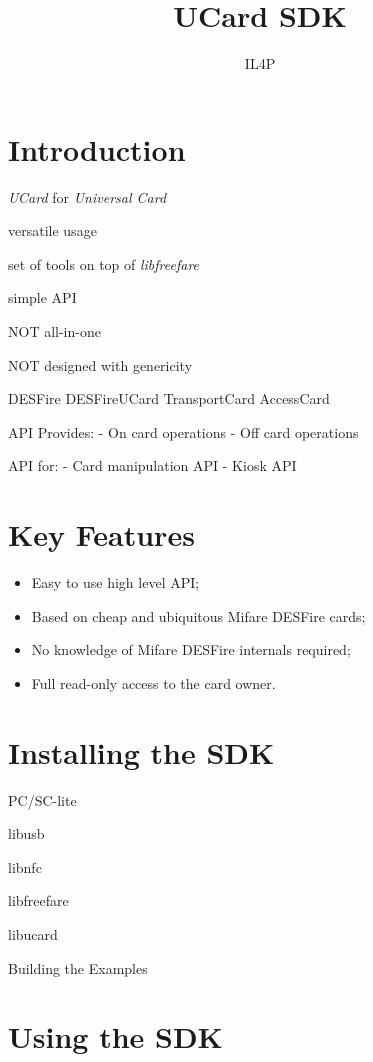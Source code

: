 \documentclass{article}
\title{UCard SDK}
\author{IL4P}
\begin{document}
\maketitle

\tableofcontents

\section{Introduction}

\emph{UCard} for \emph{Universal Card}

versatile usage

set of tools on top of \emph{libfreefare} \cite{libfreefare}

simple API

NOT all-in-one

NOT designed with genericity

DESFire
DESFireUCard
TransportCard
AccessCard

API Provides:
  - On card operations
	- Off card operations

API for:
  - Card manipulation API
	- Kiosk API

\section{Key Features}

\begin{itemize}
  \item Easy to use high level API;
	\item Based on cheap and ubiquitous Mifare DESFire cards;
	\item No knowledge of Mifare DESFire internals required;
  \item Full read-only access to the card owner.
\end{itemize}

\section{Installing the SDK}

PC/SC-lite

libusb

libnfc \cite{libnfc}

libfreefare \cite{libfreefare}

libucard

Building the Examples

\section{Using the SDK}
\end{document}
